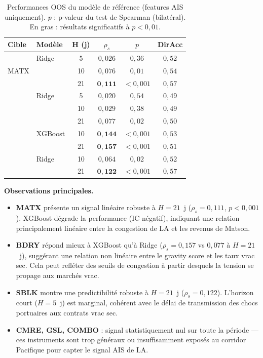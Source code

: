\begin{table}[ht]
\centering
\caption{Performances OOS du modèle de référence (features AIS uniquement).
$p$ : p-valeur du test de Spearman (bilatéral). En gras : résultats
significatifs à $p < 0{,}01$.}
\label{tab:baseline}
\small
\begin{tabular}{llcccc}
\toprule
\textbf{Cible} & \textbf{Modèle} & \textbf{H (j)} & $\rho_s$ & $p$ &
\textbf{DirAcc} \\
\midrule
\multirow{3}{*}{MATX}
  & Ridge   &  5 & $0{,}026$ & $0{,}36$ & $0{,}52$ \\
  &         & 10 & $0{,}076$ & $0{,}01$ & $0{,}54$ \\
  &         & 21 & $\mathbf{0{,}111}$ & $<0{,}001$ & $0{,}57$ \\
\addlinespace
\multirow{3}{*}{BDRY}
  & Ridge   &  5 & $0{,}020$ & $0{,}54$ & $0{,}49$ \\
  &         & 10 & $0{,}029$ & $0{,}38$ & $0{,}49$ \\
  &         & 21 & $0{,}077$ & $0{,}02$ & $0{,}50$ \\
  & XGBoost & 10 & $\mathbf{0{,}144}$ & $<0{,}001$ & $0{,}53$ \\
  &         & 21 & $\mathbf{0{,}157}$ & $<0{,}001$ & $0{,}51$ \\
\addlinespace
\multirow{2}{*}{SBLK}
  & Ridge   & 10 & $0{,}064$ & $0{,}02$ & $0{,}52$ \\
  &         & 21 & $\mathbf{0{,}122}$ & $<0{,}001$ & $0{,}57$ \\
\bottomrule
\end{tabular}
\end{table}

\noindent
\textbf{Observations principales.}

\begin{itemize}
    \item \textbf{MATX} présente un signal linéaire robuste à $H = 21$~j
    ($\rho_s = 0{,}111$, $p < 0{,}001$). XGBoost dégrade la performance
    (IC négatif), indiquant une relation principalement linéaire entre la
    congestion de LA et les revenus de Matson.

    \item \textbf{BDRY} répond mieux à XGBoost qu'à Ridge ($\rho_s = 0{,}157$
    vs $0{,}077$ à $H = 21$~j), suggérant une relation non linéaire entre
    le gravity score et les taux vrac sec. Cela peut refléter des seuils
    de congestion à partir desquels la tension se propage aux marchés vrac.

    \item \textbf{SBLK} montre une predictibilité robuste à $H = 21$~j
    ($\rho_s = 0{,}122$). L'horizon court ($H = 5$~j) est marginal,
    cohérent avec le délai de transmission des chocs portuaires aux contrats
    vrac sec.

    \item \textbf{CMRE, GSL, COMBO} : signal statistiquement nul sur toute la
    période --- ces instruments sont trop généraux ou insuffisamment exposés
    au corridor Pacifique pour capter le signal AIS de LA.
\end{itemize}


